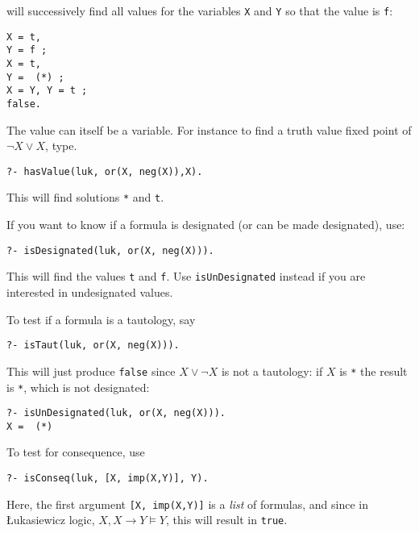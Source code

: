\documentclass[
]{article}
\newcommand{\passthrough}[1]{#1}
\begin{document}
will successively find all values for the variables
\passthrough{\lstinline!X!} and \passthrough{\lstinline!Y!} so that the
value is \passthrough{\lstinline!f!}:

\begin{lstlisting}
X = t,
Y = f ;
X = t,
Y =  (*) ;
X = Y, Y = t ;
false.
\end{lstlisting}

The value can itself be a variable. For instance to find a truth value
fixed point of \(\lnot X \lor X\), type.

\begin{lstlisting}
?- hasValue(luk, or(X, neg(X)),X).
\end{lstlisting}

This will find solutions \passthrough{\lstinline!*!} and
\passthrough{\lstinline!t!}.

If you want to know if a formula is designated (or can be made
designated), use:

\begin{lstlisting}
?- isDesignated(luk, or(X, neg(X))).
\end{lstlisting}

This will find the values \passthrough{\lstinline!t!} and
\passthrough{\lstinline!f!}. Use
\passthrough{\lstinline!isUnDesignated!} instead if you are interested
in undesignated values.

To test if a formula is a tautology, say

\begin{lstlisting}
?- isTaut(luk, or(X, neg(X))).
\end{lstlisting}

This will just produce \passthrough{\lstinline!false!} since
\(X \lor \lnot X\) is not a tautology: if \(X\) is
\passthrough{\lstinline!*!} the result is \passthrough{\lstinline!*!},
which is not designated:

\begin{lstlisting}
?- isUnDesignated(luk, or(X, neg(X))).
X =  (*) 
\end{lstlisting}

To test for consequence, use

\begin{lstlisting}
?- isConseq(luk, [X, imp(X,Y)], Y).
\end{lstlisting}

Here, the first argument \passthrough{\lstinline![X, imp(X,Y)]!} is a
\emph{list} of formulas, and since in Łukasiewicz logic,
\(X, X \to Y \models Y\), this will result in
\passthrough{\lstinline!true!}.
\end{document}
